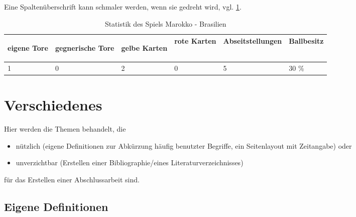 \documentclass[ngerman,               %
               a4paper,               %
               fleqn,                 %
                     ]{scrartcl}       %
\begin{document}
Eine Spaltenüberschrift kann schmaler werden, wenn sie gedreht wird,
vgl. \cref{tab:marokko-brasilien-narrow}.
\begin{table}[htb]
    \centering%
    \caption{Statistik des Spiels Marokko - Brasilien}
    \label{tab:marokko-brasilien-narrow}
    \begin{tabular}{*{6}{l}}
      \toprule%
      \begin{sideways}    %
          eigene Tore
      \end{sideways} & \begin{rotate}{60} %
          gegnerische Tore
      \end{rotate} & \begin{turn}{30} %
          gelbe Karten
      \end{turn} & rote Karten &
                                 Abseitstellungen & Ballbesitz \\\midrule
      1 & 0 & 2 & 0 & 5 & 30 \% \\\bottomrule
    \end{tabular}
\end{table}


\section{Verschiedenes}

Hier werden die Themen behandelt, die
\begin{itemize}
  \item nützlich (eigene Definitionen zur Abkürzung häufig benutzter
    Begriffe, ein Seitenlayout mit Zeitangabe) oder
  \item unverzichtbar (Erstellen einer Bibliographie/eines
    Literaturverzeichnisses)
\end{itemize}
für das Erstellen einer Abschlussarbeit sind.

\subsection{Eigene Definitionen}%
\label{sec:eigene-definitionen}
\end{document}
